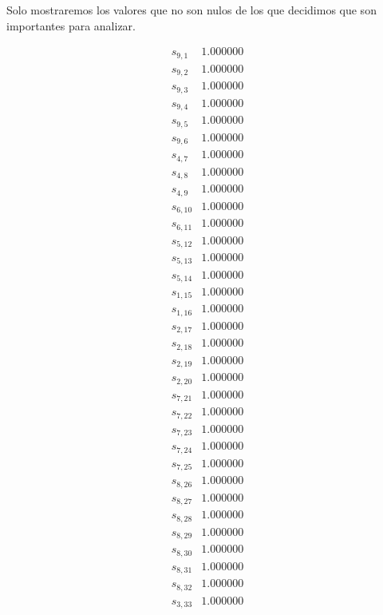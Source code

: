 \documentclass[journal, 10pt]{IEEEtran}
\begin{document}
Solo mostraremos los valores que no son nulos de los que decidimos que son importantes para analizar.
\begin{center}
	\begin{align*}
		s_{9,1}&        1.000000\\        
		s_{9,2}&        1.000000\\          
		s_{9,3}&        1.000000\\            
		s_{9,4}&        1.000000\\           
		s_{9,5}&        1.000000\\           
		s_{9,6}&        1.000000\\          
		s_{4,7}&        1.000000\\        
		s_{4,8}&        1.000000\\         
		s_{4,9}&        1.000000\\            
	 s_{6,10}&        1.000000\\           
	 s_{6,11}&        1.000000\\            
	 s_{5,12}&        1.000000\\            
	 s_{5,13}&        1.000000\\         
	 s_{5,14}&        1.000000\\            
	 s_{1,15}&        1.000000\\           
	 s_{1,16}&        1.000000\\            
	 s_{2,17}&        1.000000\\         
	 s_{2,18}&        1.000000\\          
	 s_{2,19}&        1.000000\\            
	 s_{2,20}&        1.000000\\            
	 s_{7,21}&        1.000000\\           
	 s_{7,22}&        1.000000\\            
	 s_{7,23}&        1.000000\\            
	 s_{7,24}&        1.000000\\           
	 s_{7,25}&        1.000000\\            
	 s_{8,26}&        1.000000\\           
	 s_{8,27}&        1.000000\\            
	 s_{8,28}&        1.000000\\         
	 s_{8,29}&        1.000000\\         
	 s_{8,30}&        1.000000\\          
	 s_{8,31}&        1.000000\\        
	 s_{8,32}&        1.000000\\       
	 s_{3,33}&        1.000000 
	\end{align*}
\end{center}
\end{document}
